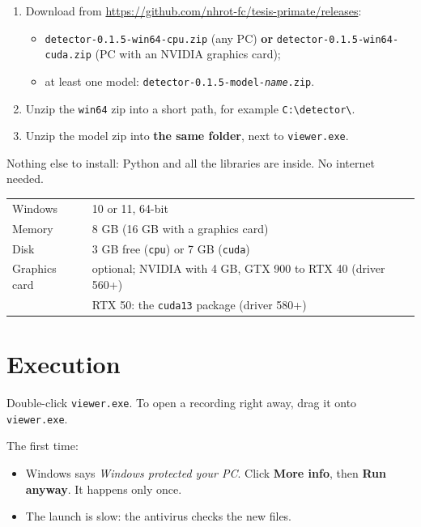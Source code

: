\documentclass[11pt,a4paper]{article}
\newcommand{\version}{0.1.5}
\newcommand{\viewer}{\texttt{viewer.exe}}
\newcommand{\ui}[1]{\textsf{\textbf{#1}}}
\newcommand{\file}[1]{\texttt{#1}}
\begin{document}
\begin{enumerate}
  \item Download from \url{https://github.com/nhrot-fc/tesis-primate/releases}:
    \begin{itemize}
      \item \file{detector-\version-win64-cpu.zip} (any PC) \textbf{or}
        \file{detector-\version-win64-cuda.zip} (PC with an NVIDIA graphics card);
      \item at least one model: \file{detector-\version-model-\emph{name}.zip}.
    \end{itemize}
  \item Unzip the \file{win64} zip into a short path, for example
    \file{C:\textbackslash detector\textbackslash}.
  \item Unzip the model zip into \textbf{the same folder}, next to \viewer{}.
\end{enumerate}

Nothing else to install: Python and all the libraries are inside. No internet needed.

\begin{center}
\begin{tabular}{@{}ll@{}}
  \toprule
  Windows & 10 or 11, 64-bit \\
  Memory & 8 GB (16 GB with a graphics card) \\
  Disk & 3 GB free (\file{cpu}) or 7 GB (\file{cuda}) \\
  Graphics card & optional; NVIDIA with 4 GB, GTX 900 to RTX 40 (driver 560+) \\
  & RTX 50: the \file{cuda13} package (driver 580+) \\
  \bottomrule
\end{tabular}
\end{center}

\section{Execution}

Double-click \viewer{}. To open a recording right away, drag it onto \viewer{}.

The first time:

\begin{itemize}
  \item Windows says \emph{Windows protected your PC}. Click \ui{More info}, then
    \ui{Run anyway}. It happens only once.
  \item The launch is slow: the antivirus checks the new files.
\end{itemize}
\end{document}
